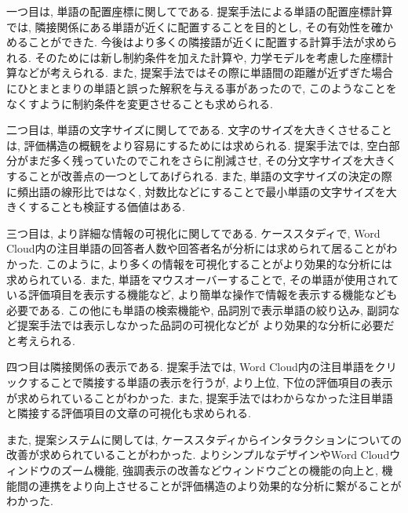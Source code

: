 \documentclass[syuuron]{kuee}
\begin{document}
		一つ目は, 単語の配置座標に関してである. 
		提案手法による単語の配置座標計算では, 隣接関係にある単語が近くに配置することを目的とし, その有効性を確かめることができた. 
		今後はより多くの隣接語が近くに配置する計算手法が求められる. 
		そのためには新し制約条件を加えた計算や, 力学モデルを考慮した座標計算などが考えられる. 
		また, 提案手法ではその際に単語間の距離が近ずぎた場合にひとまとまりの単語と誤った解釈を与える事があったので, 
		このようなことをなくすように制約条件を変更させることも求められる. 
		
		二つ目は, 単語の文字サイズに関してである. 
		文字のサイズを大きくさせることは, 評価構造の概観をより容易にするためには求められる. 
		提案手法では, 空白部分がまだ多く残っていたのでこれをさらに削減させ, その分文字サイズを大きくすることが改善点の一つとしてあげられる. 
		また, 単語の文字サイズの決定の際に頻出語の線形比ではなく, 対数比などにすることで最小単語の文字サイズを大きくすることも検証する価値はある. 
		
		三つ目は, より詳細な情報の可視化に関してである. 
		ケーススタディで, Word Cloud内の注目単語の回答者人数や回答者名が分析には求められて居ることがわかった. 
		このように, より多くの情報を可視化することがより効果的な分析には求められている. 
		また, 単語をマウスオーバーすることで, その単語が使用されている評価項目を表示する機能など, 
		より簡単な操作で情報を表示する機能なども必要である. 
		この他にも単語の検索機能や, 品詞別で表示単語の絞り込み, 副詞など提案手法では表示しなかった品詞の可視化などが
		より効果的な分析に必要だと考えられる. 
		
		四つ目は隣接関係の表示である. 
		提案手法では, Word Cloud内の注目単語をクリックすることで隣接する単語の表示を行うが, 
		より上位, 下位の評価項目の表示が求められていることがわかった. 
		また, 提案手法ではわからなかった注目単語と隣接する評価項目の文章の可視化も求められる. 
		
		また, 提案システムに関しては, ケーススタディからインタラクションについての改善が求められていることがわかった. 
		よりシンプルなデザインやWord Cloudウィンドウのズーム機能, 強調表示の改善などウィンドウごとの機能の向上と, 
		機能間の連携をより向上させることが評価構造のより効果的な分析に繋がることがわかった. 
\end{document}
